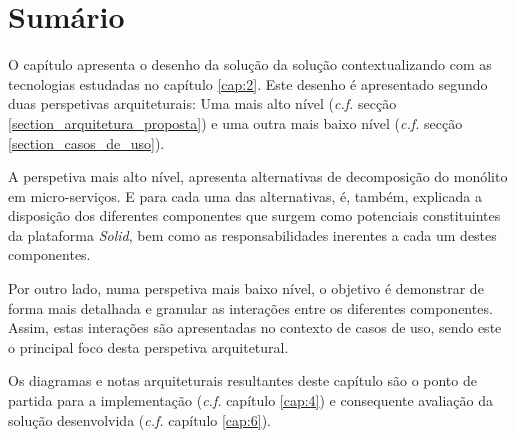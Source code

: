 \section{Sumário}
O capítulo apresenta o desenho da solução da solução contextualizando com as tecnologias estudadas no capítulo \ref{cap:2}.
Este desenho é apresentado segundo duas perspetivas arquiteturais: Uma mais alto nível (\emph{c.f.} secção \ref{section_arquitetura_proposta}) e uma outra mais baixo nível (\emph{c.f.} secção \ref{section_casos_de_uso}).

A perspetiva mais alto nível, apresenta alternativas de decomposição do monólito em micro-serviços. E para cada uma das alternativas, é, também, explicada a disposição dos diferentes componentes que surgem como potenciais constituintes da plataforma \emph{Solid}, bem como as responsabilidades inerentes a cada um destes componentes.

Por outro lado, numa perspetiva mais baixo nível, o objetivo é demonstrar de forma mais detalhada e granular as interações entre os diferentes componentes. Assim, estas interações são apresentadas no contexto de casos de uso, sendo este o principal foco desta perspetiva arquitetural.

Os diagramas e notas arquiteturais resultantes deste capítulo são o ponto de partida para a implementação (\emph{c.f.} capítulo \ref{cap:4}) e consequente avaliação da solução desenvolvida (\emph{c.f.} capítulo \ref{cap:6}).












